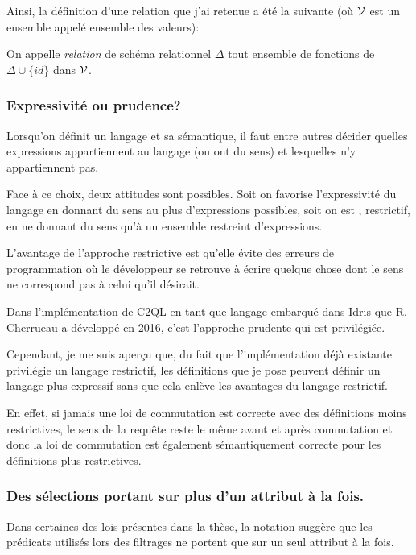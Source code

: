 Ainsi, la définition d'une relation que j'ai retenue a été la suivante
(où $\mathcal{V}$ est un ensemble appelé ensemble des valeurs):

\begin{defi*}
	On appelle \emph{relation} de schéma relationnel $\Delta$
	tout ensemble de fonctions de $\Delta \cup \{ id \}$ dans $\mathcal{V}$.
\end{defi*}

\subsubsection*{Expressivité ou prudence?}
Lorsqu'on définit un langage et sa sémantique, il faut entre autres
décider quelles expressions appartiennent au langage
(ou \og ont du sens\fg{}) et lesquelles n'y appartiennent pas.

Face à ce choix, deux attitudes sont possibles.
Soit on favorise l'expressivité du langage en donnant du sens
au plus d'expressions possibles, soit on est , restrictif,
en ne donnant du sens qu'à un ensemble restreint d'expressions.

L'avantage de l'approche restrictive est qu'elle évite des erreurs de programmation
où le développeur se retrouve à écrire quelque chose dont le sens
ne correspond pas à celui qu'il désirait.

Dans l'implémentation de C2QL en tant que langage embarqué dans Idris
que R. Cherrueau a développé en 2016, c'est l'approche
\og prudente \fg{} qui est privilégiée.

Cependant, je me suis aperçu que, du fait que l'implémentation
déjà existante privilégie un langage restrictif,
les définitions que je pose peuvent définir un langage plus
expressif sans que cela enlève
les avantages du langage restrictif.

En effet, si jamais une loi de commutation est correcte avec des définitions
moins restrictives, le sens de la requête reste le même avant et après
commutation et donc la loi de commutation est également sémantiquement correcte pour
les définitions plus restrictives.

\subsubsection*{Des sélections portant sur plus d'un attribut à la fois.}
Dans certaines des lois présentes dans la thèse, la notation
suggère que les prédicats utilisés lors des filtrages ne portent que sur
un seul attribut à la fois.

